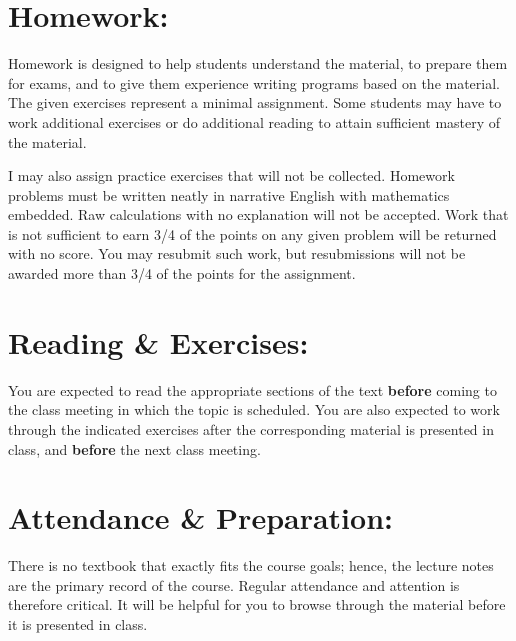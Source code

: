 \documentclass[margin]{res}
\theoremstyle{plain}
\theoremstyle{definition}
\theoremstyle{remark}
\begin{document}
\begin{resume}

\section{Homework:}
Homework is designed to help students understand the material, to prepare them for exams, and to give them experience writing programs based on the material.   The given exercises represent a minimal assignment. Some students may have to work additional exercises or do additional reading to attain sufficient mastery of the material. 

I may also assign practice exercises that will not be collected. Homework                                                                                                                                                                                                        problems must be written neatly in narrative English with mathematics embedded. Raw calculations                                                                                                                                                                                                                                                                                                                                               with no explanation will not be accepted. Work that is not sufficient to earn 3/4 of the points on any given problem will be returned with no score. You may resubmit such work, but resubmissions will not be awarded more than 3/4 of the points for the assignment.

\section{Reading \& Exercises:} You are expected to read the appropriate sections of the text \textbf{before} coming to the class meeting in which the topic is scheduled. You are also expected to work through the indicated exercises after the corresponding  material is presented in class, and \textbf{before} the next class meeting.

\section{Attendance \& Preparation:} 
There is no textbook that exactly fits the course goals; hence, the lecture notes are the primary record of the course. Regular attendance and attention is therefore critical. It will be helpful for you to browse through the material before it is presented in class.


\end{resume}
\end{document}
